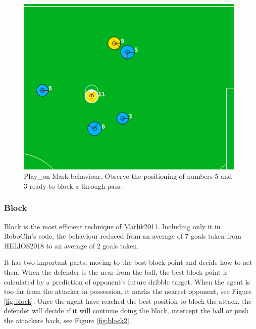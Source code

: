 \begin{figure}[H]
    \centering
    \includegraphics[scale=0.5]{images/play_on_mark2.png}
    \caption{Play\_on Mark behaviour. Observe the positioning of numbers 5 and 3 ready to block a through pass.}
    \label{fig:playonmark2}
\end{figure}

\subsubsection{Block}
Block is the most efficient technique of Marlik2011. Including only it in RoboCIn's code, the behaviour reduced from an average of 7 goals taken from  HELIOS2018 to an average of 2 goals taken. 

It has two important parts: moving to the best block point and decide how to act then. When the defender is the near from the ball, the best block point is calculated by a prediction of opponent's future dribble target. When the agent is too far from the attacker in possession, it marks the nearest opponent, see Figure \ref{fig:block}. Once the agent have reached the best position to block the attack, the defender will decide if it will continue doing the block, intercept the ball or push the attackers back, see Figure \ref{fig:block2}.


